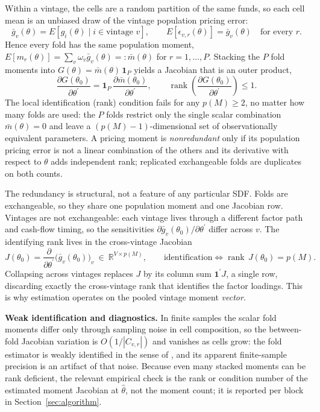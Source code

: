 \documentclass[11pt]{article}
\begin{document}
Within a vintage, the cells are a random partition of the same funds, so each cell mean is an unbiased draw of the vintage population pricing error:
\[
\bar g_v(\theta)=E\!\left[g_i(\theta)\mid i\in\text{vintage }v\right],
\qquad
E\!\left[\epsilon_{v,r}(\theta)\right]=\bar g_v(\theta)\quad\text{for every }r.
\]
Hence every fold has the same population moment, \(E[m_{r}(\theta)]=\sum_v\omega_v\bar g_v(\theta)=:\bar m(\theta)\) for \(r=1,\dots,P\). Stacking the \(P\) fold moments into \(G(\theta)=\bar m(\theta)\,\mathbf 1_P\) yields a Jacobian that is an outer product,
\[
\frac{\partial G(\theta_0)}{\partial\theta^\prime}
=\mathbf 1_P\,\frac{\partial \bar m(\theta_0)}{\partial\theta^\prime},
\qquad
\operatorname{rank}\!\left(\frac{\partial G(\theta_0)}{\partial\theta^\prime}\right)\le 1.
\]
The local identification (rank) condition fails for any \(p(M)\ge 2\), no matter how many folds are used: the \(P\) folds restrict only the single scalar combination \(\bar m(\theta)=0\) and leave a \((p(M)-1)\)-dimensional set of observationally equivalent parameters. A pricing moment is \emph{nonredundant} only if its population pricing error is not a linear combination of the others and its derivative with respect to \(\theta\) adds independent rank; replicated exchangeable folds are duplicates on both counts.

The redundancy is structural, not a feature of any particular SDF. Folds are exchangeable, so they share one population moment and one Jacobian row. Vintages are not exchangeable: each vintage lives through a different factor path and cash-flow timing, so the sensitivities \(\partial\bar g_v(\theta_0)/\partial\theta^\prime\) differ across \(v\). The identifying rank lives in the cross-vintage Jacobian
\[
J(\theta_0)=\frac{\partial}{\partial\theta^\prime}
\bigl(\bar g_{v}(\theta_0)\bigr)_{v}\ \in\ \mathbb R^{V\times p(M)},
\qquad
\text{identification}\iff \operatorname{rank}\,J(\theta_0)=p(M).
\]
Collapsing across vintages replaces \(J\) by its column sum \(\mathbf 1^\prime J\), a single row, discarding exactly the cross-vintage rank that identifies the factor loadings. This is why estimation operates on the pooled vintage moment \emph{vector}.

\textbf{Weak identification and diagnostics.} In finite samples the scalar fold moments differ only through sampling noise in cell composition, so the between-fold Jacobian variation is \(O(1/|C_{v,r}|)\) and vanishes as cells grow: the fold estimator is weakly identified in the sense of \citet{StockWright2000}, and its apparent finite-sample precision is an artifact of that noise. Because even many stacked moments can be rank deficient, the relevant empirical check is the rank or condition number of the estimated moment Jacobian at \(\hat\theta\), not the moment count; it is reported per block in Section~\ref{sec:algorithm}.
\end{document}
